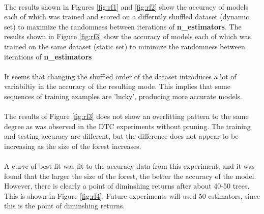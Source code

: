 \documentclass[12pt, letterpaper]{article}
\begin{document}
\paragraph*{}The results shown in Figures \ref{fig:rf1} and \ref{fig:rf2} show 
the accuracy of models each of which was trained and scored on a differntly shuffled
dataset (dynamic set) to maximize the randomness between iterations of \textbf{n\_estimators}.
The results shown in Figure \ref{fig:rf3} show the accuracy of models each of which
was trained on the same dataset (static set) to minimize the randomness between
iterations of \textbf{n\_estimators}

\paragraph*{}It seems that changing the shuffled order of the dataset introduces
a lot of variabiltiy in the accuracy of the resulting mode. This implies that some
sequences of training examples are 'lucky', producing more accurate models. 

\paragraph*{}The results of Figure \ref{fig:rf3} does not show an overfitting pattern
to the same degree as was observed in the DTC experiments without pruning. The
training and testing accuracy are different, but the difference does not appear to
be increasing as the size of the forest increases.

\paragraph*{} A curve of best fit was fit to the accuracy data from this experiment,
and it was found that the larger the size of the forest, the better the accuracy of
the model. However, there is clearly a point of diminshing returns after about
40-50 trees. This is shown in Figure \ref{fig:rf4}. Future experiments will used
50 estimators, since this is the point of diminshing returns.
\end{document}

